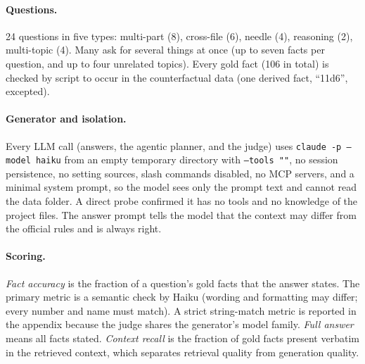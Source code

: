\documentclass[11pt,a4paper]{article}
\begin{document}
\paragraph{Questions.} 24 questions in five types: multi-part (8), cross-file (6), needle (4), reasoning (2), multi-topic (4). Many ask for several things at once (up to seven facts per question, and up to four unrelated topics). Every gold fact (106 in total) is checked by script to occur in the counterfactual data (one derived fact, ``11d6'', excepted).

\paragraph{Generator and isolation.} Every LLM call (answers, the agentic planner, and the judge) uses \texttt{claude -p --model haiku} from an empty temporary directory with \texttt{--tools ""}, no session persistence, no setting sources, slash commands disabled, no MCP servers, and a minimal system prompt, so the model sees only the prompt text and cannot read the data folder. A direct probe confirmed it has no tools and no knowledge of the project files. The answer prompt tells the model that the context may differ from the official rules and is always right.

\paragraph{Scoring.} \emph{Fact accuracy} is the fraction of a question's gold facts that the answer states. The primary metric is a semantic check by Haiku (wording and formatting may differ; every number and name must match). A strict string-match metric is reported in the appendix because the judge shares the generator's model family. \emph{Full answer} means all facts stated. \emph{Context recall} is the fraction of gold facts present verbatim in the retrieved context, which separates retrieval quality from generation quality.
\end{document}
